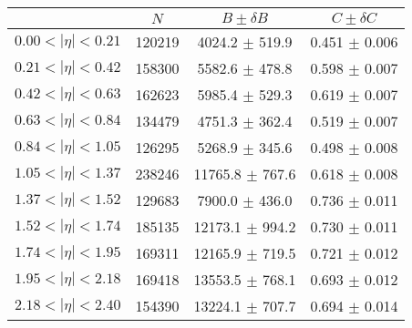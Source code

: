 \begin{tabular}{lccc}
\hline
    &   $N$   & $B \pm \delta B$  &  $C \pm \delta C$ \\
\hline
$0.00 < |\eta| <0.21$          & 120219     & 4024.2     $\pm$ 519.9 & 0.451      $\pm$ 0.006 \\
$0.21 < |\eta| <0.42$          & 158300     & 5582.6     $\pm$ 478.8 & 0.598      $\pm$ 0.007 \\
$0.42 < |\eta| <0.63$          & 162623     & 5985.4     $\pm$ 529.3 & 0.619      $\pm$ 0.007 \\
$0.63 < |\eta| <0.84$          & 134479     & 4751.3     $\pm$ 362.4 & 0.519      $\pm$ 0.007 \\
$0.84 < |\eta| <1.05$          & 126295     & 5268.9     $\pm$ 345.6 & 0.498      $\pm$ 0.008 \\
$1.05 < |\eta| <1.37$          & 238246     & 11765.8    $\pm$ 767.6 & 0.618      $\pm$ 0.008 \\
$1.37 < |\eta| <1.52$          & 129683     & 7900.0     $\pm$ 436.0 & 0.736      $\pm$ 0.011 \\
$1.52 < |\eta| <1.74$          & 185135     & 12173.1    $\pm$ 994.2 & 0.730      $\pm$ 0.011 \\
$1.74 < |\eta| <1.95$          & 169311     & 12165.9    $\pm$ 719.5 & 0.721      $\pm$ 0.012 \\
$1.95 < |\eta| <2.18$          & 169418     & 13553.5    $\pm$ 768.1 & 0.693      $\pm$ 0.012 \\
$2.18 < |\eta| <2.40$          & 154390     & 13224.1    $\pm$ 707.7 & 0.694      $\pm$ 0.014 \\
\hline
\end{tabular}
